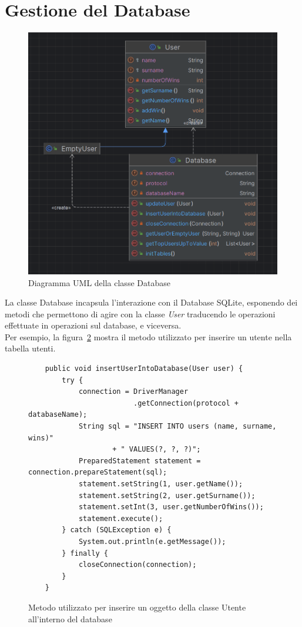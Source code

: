 \newpage
\section{Gestione del Database}\label{sec:gestione-del-database}

\begin{figure}
    \centering
    \includegraphics[scale=0.5]{img/database-uml}
    \caption{Diagramma UML della classe Database}
    \label{fig:database-uml}
\end{figure}

La classe Database incapsula l'interazione con il Database SQLite, esponendo dei metodi che permettono di agire con
la classe \textit{User} traducendo le operazioni effettuate in operazioni sul database, e viceversa. \\
Per esempio, la figura~\ref{fig:db1} mostra il metodo utilizzato per inserire un utente nella tabella utenti. \\

\begin{figure}
    \begin{verbatim}
    public void insertUserIntoDatabase(User user) {
        try {
            connection = DriverManager
                         .getConnection(protocol + databaseName);
            String sql = "INSERT INTO users (name, surname, wins)"
                    + " VALUES(?, ?, ?)";
            PreparedStatement statement = connection.prepareStatement(sql);
            statement.setString(1, user.getName());
            statement.setString(2, user.getSurname());
            statement.setInt(3, user.getNumberOfWins());
            statement.execute();
        } catch (SQLException e) {
            System.out.println(e.getMessage());
        } finally {
            closeConnection(connection);
        }
    }
    \end{verbatim}
    \caption{Metodo utilizzato per inserire un oggetto della classe Utente all'interno del database}
    \label{fig:db1}
\end{figure}

